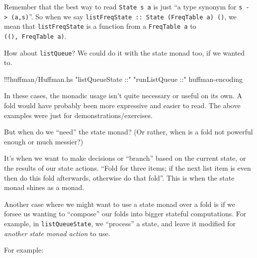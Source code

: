 \documentclass[]{article}
\newenvironment{Shaded}{}{}
\newcommand{\StringTok}[1]{\textcolor[rgb]{0.25,0.44,0.63}{{#1}}}
\newcommand{\FunctionTok}[1]{\textcolor[rgb]{0.02,0.16,0.49}{{#1}}}
\newcommand{\NormalTok}[1]{{#1}}
\begin{document}
Remember that the best way to read \texttt{State\ s\ a} is just ``a type
synonym for \texttt{s\ -\textgreater{}\ (a,s)}''. So when we say
\texttt{listFreqState\ ::\ State\ (FreqTable\ a)\ ()}, we mean that
\texttt{listFreqState} is a function from a \texttt{FreqTable\ a} to
\texttt{((),\ FreqTable\ a)}.

How about \texttt{listQueue}? We could do it with the state monad too,
if we wanted to.

\begin{Shaded}
\begin{Highlighting}[]
\FunctionTok{!!!}\NormalTok{huffman}\FunctionTok{/}\NormalTok{Huffman.hs }\StringTok{"listQueueState ::"} \StringTok{"runListQueue ::"} \NormalTok{huffman}\FunctionTok{-}\NormalTok{encoding}
\end{Highlighting}
\end{Shaded}

In these cases, the monadic usage isn't quite necessary or useful on its
own. A fold would have probably been more expressive and easier to read.
The above examples were just for demonstrations/exercises.

But when do we ``need'' the state monad? (Or rather, when is a fold not
powerful enough or much messier?)

It's when we want to make decisions or ``branch'' based on the current
state, or the results of our state actions. ``Fold for three items; if
the next list item is even then do this fold afterwards, otherwise do
that fold''. This is when the state monad shines as a monad.

Another case where we might want to use a state monad over a fold is if
we forsee us wanting to ``compose'' our folds into bigger stateful
computations. For example, in \texttt{listQueueState}, we ``process'' a
state, and leave it modified for \emph{another state monad action} to
use.

For example:
\end{document}
